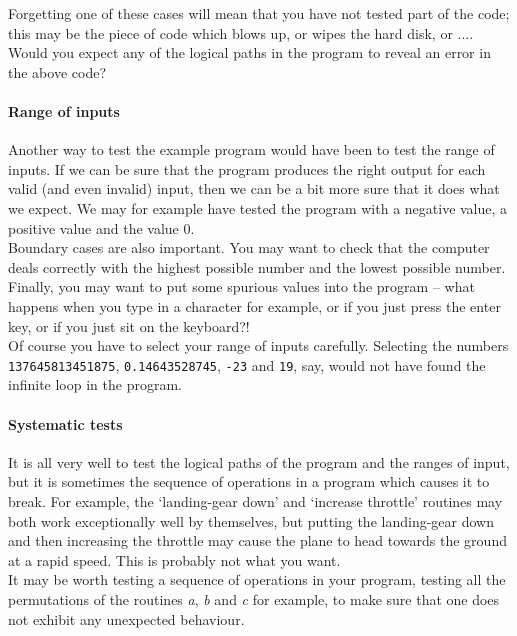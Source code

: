 \noindent
Forgetting one of these cases will mean that you have not tested part of the 
code; this may be the piece of code which blows up, or
wipes the hard disk, or .... Would you expect any of the logical paths
in the program to reveal an error in the above code?

\paragraph{Range of inputs} Another way to test the example program would have been to test the range of 
inputs. If we can be sure that the program produces the right output for
each valid (and even invalid) input, then we can be a bit more sure that it
does what we expect. We may for example have tested the program with a 
negative value, a positive value and the value 0. \\

\noindent
Boundary cases are also important. You may want to check that the computer
deals correctly with the highest possible number and the lowest possible 
number. Finally, you may want to put some spurious values into the program --
what happens when you type in a character for example, or if you just press 
the enter key, or if you just sit on the keyboard?!\\

\noindent
Of course you have to select your range of inputs carefully. Selecting the 
numbers {\tt 137645813451875},  
{\tt 0.14643528745}, {\tt -23} and {\tt 19}, say, 
would not have found the infinite loop in the program.

\paragraph{Systematic tests} It is all very well to test the logical paths of the program and
the ranges of input, but it is sometimes the sequence of operations in
a program which causes it to break. For example, the `landing-gear down' and
`increase throttle' routines may both work exceptionally well by themselves, 
but putting the landing-gear down and then increasing the throttle may cause
the plane to head towards the ground at a rapid speed. This is probably not
what you want.  \\

\noindent
It may be worth testing a sequence of operations in your program, testing
all the permutations of the routines {\em a}, {\em b} and {\em c} for example,
to make sure that one does not exhibit any unexpected behaviour. 

